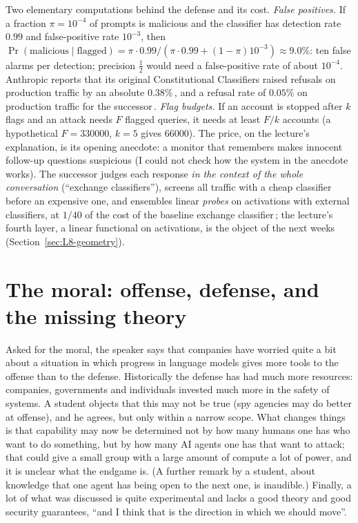\begin{beyond}
Two elementary computations behind the defense and its cost. \emph{False positives.} If a fraction $\pi=10^{-4}$ of prompts is malicious and the classifier has detection rate $0.99$ and false-positive rate $10^{-3}$, then $\Pr(\text{malicious}\mid\text{flagged})=\pi\cdot0.99/(\pi\cdot0.99+(1-\pi)10^{-3})\approx9.0\%$: ten false alarms per detection; precision $\tfrac12$ would need a false-positive rate of about $10^{-4}$. Anthropic reports that its original Constitutional Classifiers raised refusals on production traffic by an absolute $0.38\%$\,\citep{sharma2025}, and a refusal rate of $0.05\%$ on production traffic for the successor\,\citep{cunningham2026}. \emph{Flag budgets.} If an account is stopped after $k$ flags and an attack needs $F$ flagged queries, it needs at least $F/k$ accounts (a hypothetical $F=330000$, $k=5$ gives $66000$). The price, on the lecture's explanation, is its opening anecdote: a monitor that remembers makes innocent follow-up questions suspicious (I could not check how the system in the anecdote works). The successor judges each response \emph{in the context of the whole conversation} (``exchange classifiers''), screens all traffic with a cheap classifier before an expensive one, and ensembles linear \emph{probes} on activations with external classifiers, at $1/40$ of the cost of the baseline exchange classifier\,\citep{cunningham2026}; the lecture's fourth layer, a linear functional on activations, is the object of the next weeks (Section~\ref{sec:L8-geometry}).
\end{beyond}

\section{The moral: offense, defense, and the missing theory}\label{sec:L8-moral}
Asked for the moral, the speaker says that companies have worried quite a bit about a situation in which progress in language models gives more tools to the offense than to the defense. Historically the defense has had much more resources: companies, governments and individuals invested much more in the safety of systems. A student objects that this may not be true (spy agencies may do better at offense), and he agrees, but only within a narrow scope. What changes things is that capability may now be determined not by how many humans one has who want to do something, but by how many AI agents one has that want to attack; that could give a small group with a large amount of compute a lot of power, and it is unclear what the endgame is. (A further remark by a student, about knowledge that one agent has being open to the next one, is inaudible\flag.) Finally, a lot of what was discussed is quite experimental and lacks a good theory and good security guarantees, ``and I think that is the direction in which we should move''.

